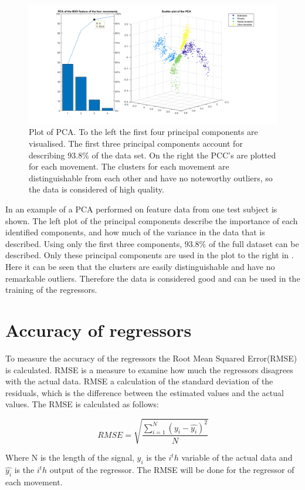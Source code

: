\begin{figure}[H]
	\includegraphics[width=.4\textwidth]{figures/Methods/pcasubplot.png} 
	\caption{Plot of PCA. To the left the first four principal components are visualised. The first three principal components account for describing $93.8\%$ of the data set. On the right the PCC's are plotted for each movement. The clusters for each movement are distinguishable from each other and have no noteworthy outliers, so the data is considered of high quality.} 
	\label{fig:pcasubplot}
\end{figure} 

In  an example of a PCA performed on feature data from one test subject is shown. The left plot of the principal components describe the importance of each identified components, and how much of the variance in the data that is described. Using only the first three components, $93.8\%$ of the full dataset can be described. Only these principal components are used in the plot to the right in . Here it can be seen that the clusters are easily distinguishable and have no remarkable outliers. Therefore the data is considered good and can be used in the training of the regressors.


\section{Accuracy of regressors}
To measure the accuracy of the regressors the Root Mean Squared Error(RMSE) is calculated. RMSE is a measure to examine how much the regressors disagrees with the actual data. RMSE a calculation of the standard deviation of the residuals, which is the difference between the estimated values and the actual values. The RMSE is calculated as follows:

\begin{equation}
RMSE = \sqrt{\frac{\sum\limits_{i=1}^N(y_i - \hat{y_i})^2}{N}}
\end{equation}

Where N is the length of the signal, $y_i$ is the $i^th$ variable of the actual data and $\hat{y_i}$ is the $i^th$ output of the regressor. The RMSE will be done for the regressor of each movement.


